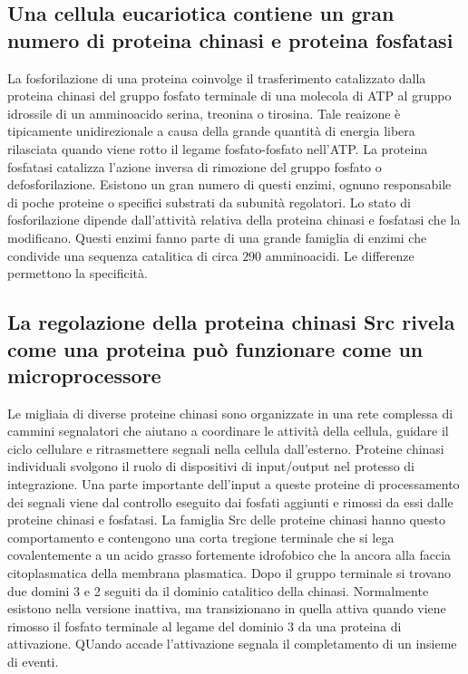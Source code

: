 \subsection{Una cellula eucariotica contiene un gran numero di proteina chinasi e proteina fosfatasi}
La fosforilazione di una proteina coinvolge il trasferimento catalizzato dalla proteina chinasi del gruppo fosfato terminale di una molecola di ATP al gruppo idrossile di un amminoacido 
serina, treonina o tirosina. Tale reaizone \`e tipicamente unidirezionale a causa della grande quantit\`a di energia libera rilasciata quando viene rotto il legame fosfato-fosfato 
nell'ATP. La proteina fosfatasi catalizza l'azione inversa di rimozione del gruppo fosfato o defosforilazione. Esistono un gran numero di questi enzimi, ognuno responsabile di 
poche proteine o specifici substrati  da subunit\`a regolatori. Lo stato di fosforilazione dipende dall'attivit\`a relativa della proteina chinasi e fosfatasi che la modificano.
Questi enzimi fanno parte di una grande famiglia di enzimi che condivide una sequenza catalitica di circa $290$ amminoacidi. Le differenze permettono la specificit\`a. 
\subsection{La regolazione della proteina chinasi Src rivela come una proteina pu\`o funzionare come un microprocessore}
Le migliaia di diverse proteine chinasi sono organizzate in una rete complessa di cammini segnalatori che aiutano a coordinare le attivit\`a della cellula, guidare il ciclo cellulare e 
ritrasmettere segnali nella cellula dall'esterno. Proteine chinasi individuali svolgono il ruolo di dispositivi di input/output nel protesso di integrazione. Una parte importante 
dell'input a queste proteine di processamento dei segnali viene dal controllo eseguito dai fosfati aggiunti e rimossi da essi dalle proteine chinasi e fosfatasi. La famiglia Src delle
proteine chinasi hanno questo comportamento e contengono una corta tregione  terminale che si lega covalentemente a un acido grasso fortemente idrofobico che la ancora alla
faccia citoplasmatica della membrana plasmatica. Dopo il gruppo terminale si trovano due domini 3 e 2 seguiti da il dominio catalitico della chinasi. Normalmente esistono 
nella versione inattiva, ma transizionano in quella attiva quando viene rimosso il fosfato  terminale al legame del dominio 3 da una proteina di attivazione. QUando accade
l'attivazione segnala il completamento di un insieme di eventi. 
